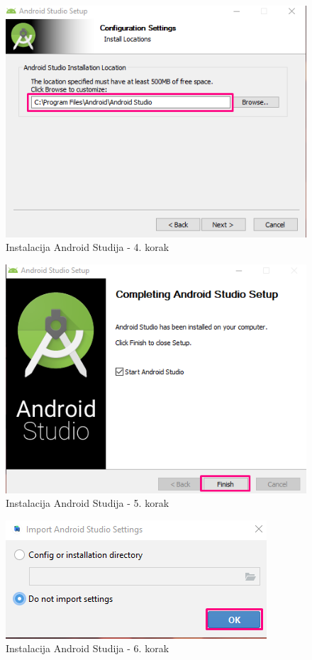\documentclass[11pt,a4paper,twoside]{article}
\begin{document}
\begin{figure}[!h]
	\centering
	\includegraphics{install_04.png}
	\caption{Instalacija Android Studija - 4. korak}
	\label{fig:install_04}	
\end{figure}

\begin{figure}[!h]
	\centering
	\includegraphics{install_05.png}
	\caption{Instalacija Android Studija - 5. korak}
	\label{fig:install_05}	
\end{figure}

\begin{figure}[!h]
	\centering
	\includegraphics{install_06.png}
	\caption{Instalacija Android Studija - 6. korak}
	\label{fig:install_06}	
\end{figure}
\end{document}
